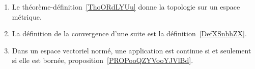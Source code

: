 \begin{enumerate}
    \item
        Le théorème-définition~\ref{ThoORdLYUu} donne la topologie sur un espace métrique.
    \item
        La définition de la convergence d'une suite est la définition~\ref{DefXSnbhZX}.
    \item
        Dans un espace vectoriel normé, une application est continue si et seulement si elle est bornée, proposition~\ref{PROPooQZYVooYJVlBd}.
\end{enumerate}
